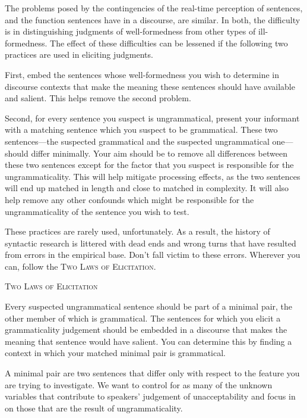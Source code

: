 {The problems posed by the contingencies of the real-time perception of sentences, and the function sentences have in a discourse, are similar. In both, the difficulty is in distinguishing judgments of well-formedness from other types of ill-formedness. The effect of these difficulties can be lessened if the following two practices are used in eliciting judgments.

First, embed the sentences whose well-formedness you wish to determine in discourse contexts that make the meaning these sentences should have available and salient. This helps remove the second problem.

Second, for every sentence you suspect is ungrammatical, present your informant with a matching sentence which you suspect to be grammatical. These two sentences---the suspected grammatical and the suspected ungrammatical one---should differ minimally. Your aim should be to remove all differences between these two sentences except for the factor that you suspect is responsible for the ungrammaticality. This will help mitigate processing effects, as the two sentences will end up matched in length and close to matched in complexity. It will also help remove any other confounds which might be responsible for the ungrammaticality of the sentence you wish to test.

These practices are rarely used, unfortunately. As a result, the history of syntactic research is littered with dead ends and wrong turns that have resulted from errors in the empirical base. Don't fall victim to these errors. Wherever you can, follow the \textsc{Two Laws of Elicitation}.
\begin{exe}
\ex \label{ex:lelaws} \textsc{Two Laws of Elicitation}
\begin{xlist}
		\ex Every suspected ungrammatical sentence should be part of a minimal pair, the other member of which is grammatical.
	\ex The sentences for which you elicit a grammaticality judgement should be embedded in a discourse that makes the meaning that sentence would have salient. You can determine this by finding a context in which your matched minimal pair is grammatical.
\end{xlist}
\end{exe}
A minimal pair are two sentences that differ only with respect to the feature you are trying to investigate. We want to control for as many of the unknown variables that contribute to speakers' judgement of unacceptability and focus in on those that are the result of ungrammaticality.

}
